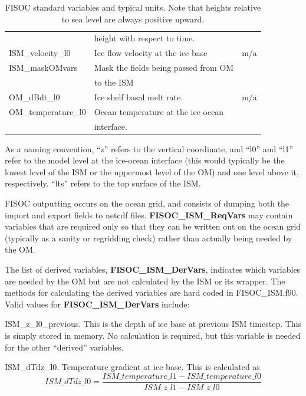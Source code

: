\documentclass[11pt]{article}
\begin{document}
\begin{table}
\begin{center}
\begin{tabular}{ l|l|l }
                            & height with respect to time.                 &   \\
      ISM\_velocity\_l0     & Ice flow velocity at the ice base            & m/a \\
      ISM\_maskOMvars       & Mask the fields being passed from OM         &   \\
                            & to the ISM                                   &   \\
      OM\_dBdt\_l0          & Ice shelf basal melt rate.                   & m/a \\
      OM\_temperature\_l0   & Ocean temperature at the ice ocean           &   \\
                            & interface.                                   &   \\
    \end{tabular}
  \end{center}
  \caption{FISOC standard variables and typical units.  
    Note that heights relative to sea level are always positive upward.}
  \label{tab:vars}
\end{table}

As a naming convention, ``z'' refers to the vertical coordinate, and ``l0'' and ``l1'' refer to the 
model level at the ice-ocean interface (this would typically be the lowest level of the ISM or 
the uppermost level of the OM) and one level above it, respectively. ``lts'' refers to the top 
surface of the ISM.

FISOC outputting occurs on the ocean grid, and consists of dumping both the import and 
export fields to netcdf files. 
\textbf{FISOC\_ISM\_ReqVars} may contain variables that are required only so that they can be written 
out on the ocean grid (typically as a sanity or regridding check) rather 
than actually being needed by the OM.

The list of derived variables, \textbf{FISOC\_ISM\_DerVars}, indicates which variables are needed by the 
OM but are not calculated by the ISM or its wrapper. 
The methods for calculating the derived variables are hard coded in FISOC\_ISM.f90. 
Valid values for  \textbf{FISOC\_ISM\_DerVars} include:

ISM\_z\_l0\_previous.  This is the depth of ice base at previous ISM timestep. This is simply stored 
in memory.  No calculation is required, but this variable is needed for the other ``derived'' variables. 

ISM\_dTdz\_l0.  Temperature gradient at ice base.  This is calculated as 
\begin{equation}
ISM\_dTdz\_l0 = \frac{ISM\_temperature\_l1 - ISM\_temperature\_l0}{ISM\_z\_l1 - ISM\_z\_l0}
\end{equation}
\end{document}
